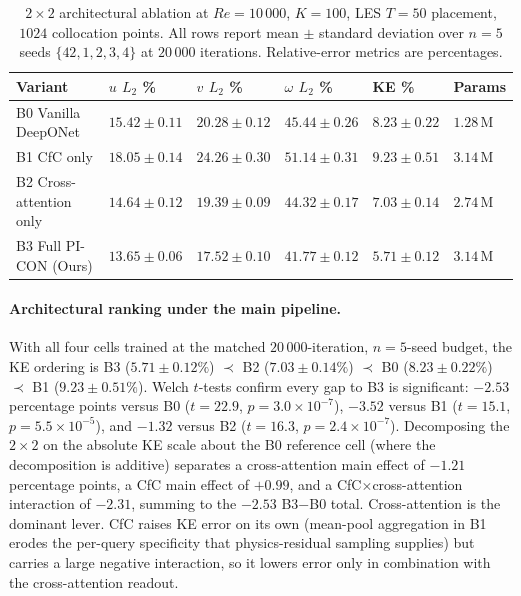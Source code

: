 \begin{table}[!htbp]
    \centering
    \caption{$2\times2$ architectural ablation at $Re=10\,000$, $K=100$, LES $T=50$ placement, $1024$ collocation points. All rows report mean $\pm$ standard deviation over $n=5$ seeds $\{42,1,2,3,4\}$ at $20\,000$ iterations. Relative-error metrics are percentages.}
    \label{tab:ablation_22matrix}
    \footnotesize
    \setlength{\tabcolsep}{3pt}
    \begin{tabularx}{\textwidth}{
        >{\raggedright\arraybackslash}p{4.0cm}
        >{\centering\arraybackslash}X
        >{\centering\arraybackslash}X
        >{\centering\arraybackslash}X
        >{\centering\arraybackslash}X
        >{\centering\arraybackslash}p{1.3cm}
    }
    \toprule
    \textbf{Variant} & \textbf{$u$ $L_2$ \%} & \textbf{$v$ $L_2$ \%} & \textbf{$\omega$ $L_2$ \%} & \textbf{KE \%} & \textbf{Params} \\
    \midrule
    B0 Vanilla DeepONet     & $15.42 {\pm} 0.11$ & $20.28 {\pm} 0.12$ & $45.44 {\pm} 0.26$ & $8.23 {\pm} 0.22$ & $1.28$\,M \\
    B1 CfC only             & $18.05 {\pm} 0.14$ & $24.26 {\pm} 0.30$ & $51.14 {\pm} 0.31$ & $9.23 {\pm} 0.51$ & $3.14$\,M \\
    B2 Cross-attention only & $14.64 {\pm} 0.12$ & $19.39 {\pm} 0.09$ & $44.32 {\pm} 0.17$ & $7.03 {\pm} 0.14$ & $2.74$\,M \\
    B3 Full PI-CON (Ours)   & $\mathbf{13.65 {\pm} 0.06}$ & $\mathbf{17.52 {\pm} 0.10}$ & $\mathbf{41.77 {\pm} 0.12}$ & $\mathbf{5.71 {\pm} 0.12}$ & $3.14$\,M \\
    \bottomrule
    \end{tabularx}
\end{table}

\paragraph{Architectural ranking under the main pipeline.}
With all four cells trained at the matched $20\,000$-iteration, $n=5$-seed budget, the KE ordering is B3 ($5.71 \pm 0.12\%$) $\prec$ B2 ($7.03 \pm 0.14\%$) $\prec$ B0 ($8.23 \pm 0.22\%$) $\prec$ B1 ($9.23 \pm 0.51\%$). Welch $t$-tests confirm every gap to B3 is significant: $-2.53$ percentage points versus B0 ($t=22.9$, $p=3.0\times10^{-7}$), $-3.52$ versus B1 ($t=15.1$, $p=5.5\times10^{-5}$), and $-1.32$ versus B2 ($t=16.3$, $p=2.4\times10^{-7}$). Decomposing the $2\times2$ on the absolute KE scale about the B0 reference cell (where the decomposition is additive) separates a cross-attention main effect of $-1.21$ percentage points, a CfC main effect of $+0.99$, and a CfC$\times$cross-attention interaction of $-2.31$, summing to the $-2.53$ B3$-$B0 total. Cross-attention is the dominant lever. CfC raises KE error on its own (mean-pool aggregation in B1 erodes the per-query specificity that physics-residual sampling supplies) but carries a large negative interaction, so it lowers error only in combination with the cross-attention readout.

